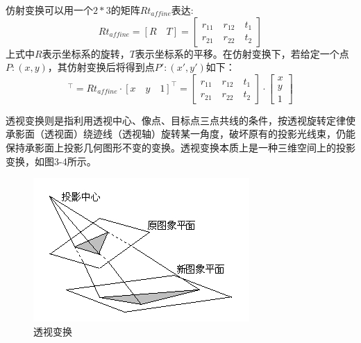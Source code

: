 仿射变换可以用一个$2*3$的矩阵$Rt_{affine}$表达:
\begin{equation}
	Rt_{affine}=\left[R\quad T\right]=
	\left[
	\begin{aligned}
	r_{11}\quad r_{12}\quad t_1 \\
	r_{21}\quad r_{22}\quad t_2
	\end{aligned}
	\right]
\end{equation}
上式中$R$表示坐标系的旋转，$T$表示坐标系的平移。在仿射变换下，若给定一个点$P:(x,y)$，其仿射变换后将得到点$P':(x',y')$如下：
\begin{equation}
	[x'\quad y']^\top=Rt_{affine}\cdot [x\quad y\quad 1]^\top=
	\left[
	\begin{aligned}
	r_{11}\quad r_{12}\quad t_1 \\
	r_{21}\quad r_{22}\quad t_2
	\end{aligned}
	\right]\cdot 
	\left[
	\begin{aligned}
	x \\
	y \\
	1
	\end{aligned}
	\right]
\end{equation}
		
透视变换则是指利用透视中心、像点、目标点三点共线的条件，按透视旋转定律使承影面（透视面）绕迹线（透视轴）旋转某一角度，破坏原有的投影光线束，仍能保持承影面上投影几何图形不变的变换。透视变换本质上是一种三维空间上的投影变换，如图3-4所示。
\begin{figure}[htb]
	\centering 
	\includegraphics[scale=1.0]{./mypic/透视变换.jpg} 
	\caption{透视变换} 
\end{figure}

